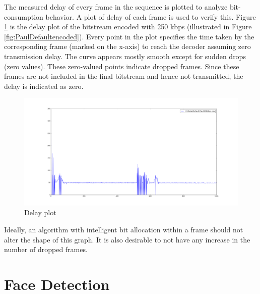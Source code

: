\documentclass[11pt]{article} %
\begin{document}
The measured delay of every frame in the sequence is plotted to analyze bit-consumption behavior. A plot of delay of each frame is used to verify this. Figure \ref{fig:PaulDefault250kbpsDelay} is the delay plot of the bitstream encoded with 250 kbps (illustrated in Figure \ref{fig:PaulDefaultencoded}). Every point in the plot specifies the time taken by the corresponding frame (marked on the x-axis) to reach the decoder assuming zero transmission delay. The curve appears mostly smooth except for sudden drops (zero values). These zero-valued points indicate dropped frames. Since these frames are not included in the final bitstream and hence not transmitted, the delay is indicated as zero. 
\begin{figure}[!h]
    \includegraphics[scale=0.25]{PaulDefault250kbpsDelay}
    \caption{Delay plot}
    \label{fig:PaulDefault250kbpsDelay}
\end{figure} 
Ideally, an algorithm with intelligent bit allocation within a frame should not alter the shape of this graph. It is also desirable to not have any increase in the number of dropped frames. %
\clearpage
%
%
\section{Face Detection}
\end{document}
